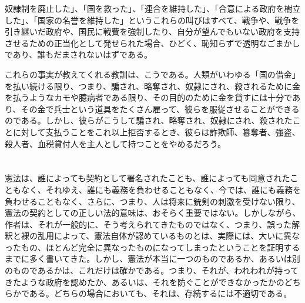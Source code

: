 \documentclass[dvipdfmx, uplatex, tate, landscape]{utbook}
\begin{document}
奴隷制を廃止した」、「国を救った」、「連合を維持した」、「合意による政府を樹立した」、「国家の名誉を維持した」というこれらの叫びはすべて、戦争や、戦争を引き継いだ政府や、国民に戦費を強制したり、自分が望んでもいない政府を支持させるための正当化として発せられた場合、ひどく、恥知らずで透明なごまかしであり、誰もだまされないはずである。

これらの事実が教えてくれる教訓は、こうである。人類がいわゆる「国の借金」を払い続ける限り、つまり、騙され、略奪され、奴隷にされ、殺されるために金を払うようなカモや臆病者である限り、その目的のために金を貸すには十分であり、その金で兵士という道具をたくさん雇って、彼らを服従させることができるのである。しかし、彼らがこうして騙され、略奪され、奴隷にされ、殺されたことに対して支払うことをこれ以上拒否するとき、彼らは詐欺師、簒奪者、強盗、殺人者、血税貸付人を主人として持つことをやめるだろう。

\appendix
\chapter{}

憲法は、誰によっても契約として署名されたことも、誰によっても同意されたこともなく、それゆえ、誰にも義務を負わせることもなく、今では、誰にも義務を負わせることもなく、さらに、つまり、人は将来に銃剣の刺激を受けない限り、憲法の契約としての正しい法的意味は、おそらく重要ではない。しかしながら、作者は、それが一般的に、そう考えられてきたものではなく、つまり、誤った解釈と裸の乱用によって、憲法自体が認めているものとは、実際には、大いに異なったもの、ほとんど完全に異なったものになってしまったということを証明するまでに多く書いてきた。しかし、憲法が本当に一つのものであるか、あるいは別のものであるかは、これだけは確かである。つまり、それが、われわれが持ってきたような政府を認めたか、あるいは、それを防ぐことができなかったかのどちらかである。どちらの場合においても、それは、存続するには不適切である。
\end{document}
